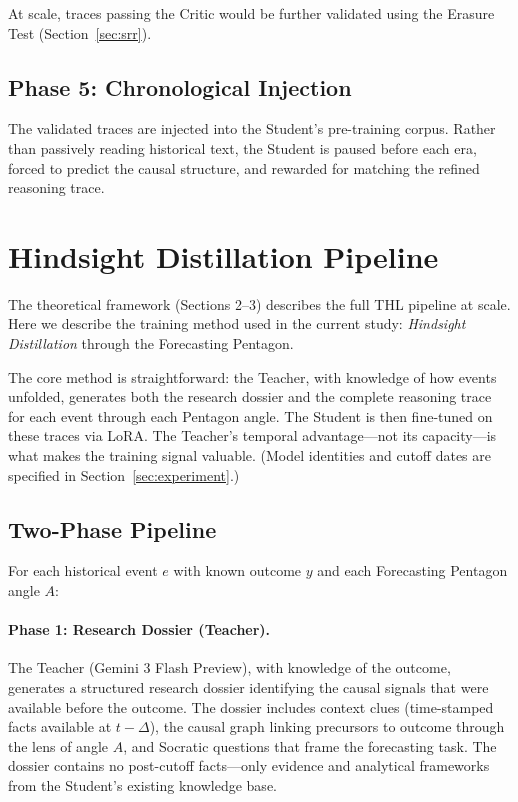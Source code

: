 \documentclass[11pt,a4paper]{article}
\begin{document}
At scale, traces passing the Critic would be further validated using the Erasure Test (Section~\ref{sec:srr}).

\subsection{Phase 5: Chronological Injection}
The validated traces are injected into the Student's pre-training corpus. Rather than passively reading historical text, the Student is paused before each era, forced to predict the causal structure, and rewarded for matching the refined reasoning trace.

\section{Hindsight Distillation Pipeline}
\label{sec:gsr}

The theoretical framework (Sections 2--3) describes the full THL pipeline at scale. Here we describe the training method used in the current study: \emph{Hindsight Distillation} through the Forecasting Pentagon.

The core method is straightforward: the Teacher, with knowledge of how events unfolded, generates both the research dossier and the complete reasoning trace for each event through each Pentagon angle. The Student is then fine-tuned on these traces via LoRA. The Teacher's temporal advantage---not its capacity---is what makes the training signal valuable. (Model identities and cutoff dates are specified in Section~\ref{sec:experiment}.)

\subsection{Two-Phase Pipeline}

For each historical event $e$ with known outcome $y$ and each Forecasting Pentagon angle $A$:

\paragraph{Phase 1: Research Dossier (Teacher).}
The Teacher (Gemini 3 Flash Preview), with knowledge of the outcome, generates a structured research dossier identifying the causal signals that were available before the outcome. The dossier includes context clues (time-stamped facts available at $t-\Delta$), the causal graph linking precursors to outcome through the lens of angle $A$, and Socratic questions that frame the forecasting task. The dossier contains no post-cutoff facts---only evidence and analytical frameworks from the Student's existing knowledge base.
\end{document}
